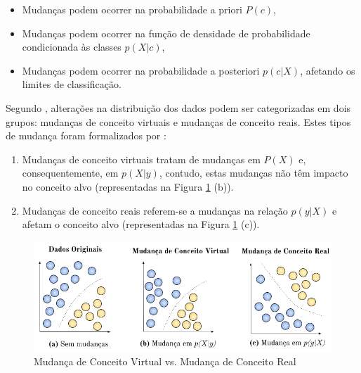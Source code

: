 \documentclass[qual, classic, a4paper]{ufbathesis}
\begin{document}
\begin{itemize}
    \item Mudanças podem ocorrer na probabilidade a priori $P(c)$,
    \item Mudanças podem ocorrer na função de densidade de probabilidade condicionada às classes $p(X|c)$,
    \item Mudanças podem ocorrer na probabilidade a posteriori $p(c|X)$, afetando os limites de classificação.
\end{itemize}

Segundo \cite{Widmer:1996:LPC:226791.226798}, alterações na distribuição dos dados podem ser categorizadas em dois grupos:
mudanças de conceito virtuais e mudanças de conceito reais.
Estes tipos de mudança foram formalizados por \cite{Zliobaite:2010, Gama:2014:SCD:2597757.2523813}:

\begin{enumerate}
    \item Mudanças de conceito virtuais tratam de mudanças em $P(X)$ e, consequentemente, em $p(X|y)$,
    contudo, estas mudanças não têm impacto no conceito alvo (representadas na Figura \ref{fig:real_and_virtual_concept_drift} (b)).
    \item Mudanças de conceito reais referem-se a mudanças na relação $p(y|X)$ e afetam o conceito alvo (representadas na Figura \ref{fig:real_and_virtual_concept_drift} (c)).
\end{enumerate}

\begin{figure}[!ht]
\begin{center}
    \includegraphics[scale=0.8]{imagens/concept_drift.png}
    \caption{Mudança de Conceito Virtual vs. Mudança de Conceito Real}
    \label{fig:real_and_virtual_concept_drift}
\end{center}
\end{figure}
\end{document}
